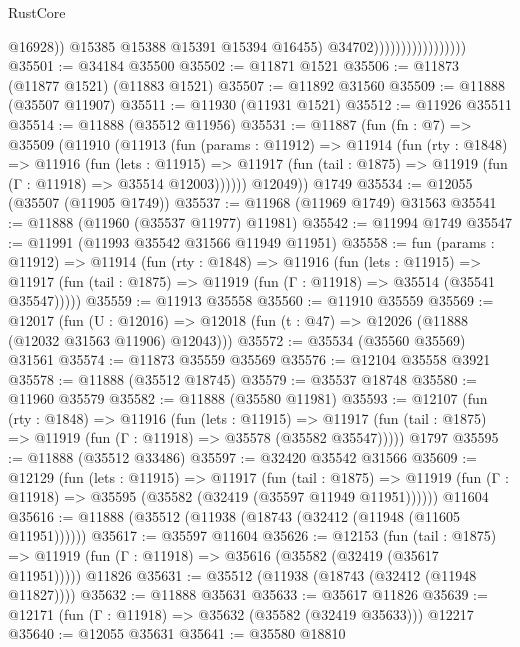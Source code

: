 \begin{lexlean}{RustCore}
\begin{coremodule}
                                            @16928))
                                        @15385
                                        @15388
                                        @15391
                                        @15394
                                        @16455)
                                      @34702)))))))))))))))))
@35501 := @34184 @35500
@35502 := @11871 @1521
@35506 := @11873 (@11877 @1521) (@11883 @1521)
@35507 := @11892 @31560
@35509 := @11888 (@35507 @11907)
@35511 := @11930 (@11931 @1521)
@35512 := @11926 @35511
@35514 := @11888 (@35512 @11956)
@35531 := @11887
    (fun (fn : @7) =>
    @35509
      (@11910
        (@11913
          (fun (params : @11912) =>
          @11914
            (fun (rty : @1848) =>
            @11916
              (fun (lets : @11915) =>
              @11917 (fun (tail : @1875) => @11919 (fun (Γ : @11918) => @35514 @12003))))))
        @12049))
    @1749
@35534 := @12055 (@35507 (@11905 @1749))
@35537 := @11968 (@11969 @1749) @31563
@35541 := @11888 (@11960 (@35537 @11977) @11981)
@35542 := @11994 @1749
@35547 := @11991 (@11993 @35542 @31566 @11949 @11951)
@35558 := fun (params : @11912) =>
  @11914
    (fun (rty : @1848) =>
    @11916
      (fun (lets : @11915) =>
      @11917 (fun (tail : @1875) => @11919 (fun (Γ : @11918) => @35514 (@35541 @35547)))))
@35559 := @11913 @35558
@35560 := @11910 @35559
@35569 := @12017
    (fun (U : @12016) => @12018 (fun (t : @47) => @12026 (@11888 (@12032 @31563 @11906) @12043)))
@35572 := @35534 (@35560 @35569) @31561
@35574 := @11873 @35559 @35569
@35576 := @12104 @35558 @3921
@35578 := @11888 (@35512 @18745)
@35579 := @35537 @18748
@35580 := @11960 @35579
@35582 := @11888 (@35580 @11981)
@35593 := @12107
    (fun (rty : @1848) =>
    @11916
      (fun (lets : @11915) =>
      @11917 (fun (tail : @1875) => @11919 (fun (Γ : @11918) => @35578 (@35582 @35547)))))
    @1797
@35595 := @11888 (@35512 @33486)
@35597 := @32420 @35542 @31566
@35609 := @12129
    (fun (lets : @11915) =>
    @11917
      (fun (tail : @1875) =>
      @11919 (fun (Γ : @11918) => @35595 (@35582 (@32419 (@35597 @11949 @11951))))))
    @11604
@35616 := @11888 (@35512 (@11938 (@18743 (@32412 (@11948 (@11605 @11951))))))
@35617 := @35597 @11604
@35626 := @12153
    (fun (tail : @1875) => @11919 (fun (Γ : @11918) => @35616 (@35582 (@32419 (@35617 @11951)))))
    @11826
@35631 := @35512 (@11938 (@18743 (@32412 (@11948 @11827))))
@35632 := @11888 @35631
@35633 := @35617 @11826
@35639 := @12171 (fun (Γ : @11918) => @35632 (@35582 (@32419 @35633))) @12217
@35640 := @12055 @35631
@35641 := @35580 @18810

\end{coremodule}
\end{lexlean}
